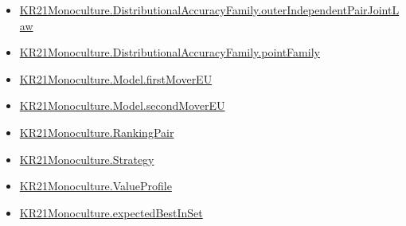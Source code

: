 \documentclass[10pt]{article}
\begin{document}
\begin{itemize}
\item \hyperlink{governing-declaration-e6c9a24a5d927c25}{KR21\allowbreak{}Monoculture.\allowbreak{}Distributional\allowbreak{}Accuracy\allowbreak{}Family.\allowbreak{}outer\allowbreak{}Independent\allowbreak{}Pair\allowbreak{}Joint\allowbreak{}Law}
\item \hyperlink{governing-declaration-6c17a1f578028c9d}{KR21\allowbreak{}Monoculture.\allowbreak{}Distributional\allowbreak{}Accuracy\allowbreak{}Family.\allowbreak{}point\allowbreak{}Family}
\item \hyperlink{governing-declaration-c7e343ac9b4d37a5}{KR21\allowbreak{}Monoculture.\allowbreak{}Model.\allowbreak{}first\allowbreak{}Mover\allowbreak{}EU}
\item \hyperlink{governing-declaration-e4f79c4b5e166782}{KR21\allowbreak{}Monoculture.\allowbreak{}Model.\allowbreak{}second\allowbreak{}Mover\allowbreak{}EU}
\item \hyperlink{governing-declaration-90a7e19d973f51cb}{KR21\allowbreak{}Monoculture.\allowbreak{}Ranking\allowbreak{}Pair}
\item \hyperlink{paper-prerequisite-b00425a844bd2ddf}{KR21\allowbreak{}Monoculture.\allowbreak{}Strategy}
\item \hyperlink{paper-prerequisite-c0e41e9b0e843969}{KR21\allowbreak{}Monoculture.\allowbreak{}Value\allowbreak{}Profile}
\item \hyperlink{paper-prerequisite-b8698660538f90e1}{KR21\allowbreak{}Monoculture.\allowbreak{}expected\allowbreak{}Best\allowbreak{}In\allowbreak{}Set}
\end{itemize}
\end{document}
